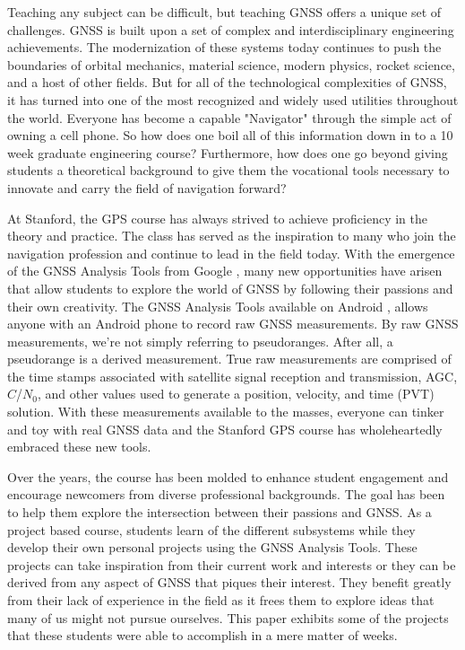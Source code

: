 \documentclass[12pt, conference, onecolumn, draftclsnofoot]{IEEEtran}
\begin{document}
Teaching any subject can be difficult, but teaching GNSS offers a unique set of challenges.
GNSS is built upon a set of complex and interdisciplinary engineering achievements. 
The modernization of these systems today continues to push the boundaries of orbital mechanics, material science, modern physics, rocket science, and a host of other fields.
But for all of the technological complexities of GNSS, it has turned into one of the most recognized and widely used utilities throughout the world.
Everyone has become a capable "Navigator" through the simple act of owning a cell phone.
So how does one boil all of this information down in to a 10 week graduate engineering course?
Furthermore, how does one go beyond giving students a theoretical background to give them the vocational tools necessary to innovate and carry the field of navigation forward?

At Stanford, the GPS course has always strived to achieve proficiency in the theory and practice.
The class has served as the inspiration to many who join the navigation profession and continue to lead in the field today.
With the emergence of the GNSS Analysis Tools from Google \cite{vanDiggelen2018}, many new opportunities have arisen that allow students to explore the world of GNSS by following their passions and their own creativity.
The GNSS Analysis Tools available on Android \cite{GNSSAnalysisTools}, allows anyone with an Android phone to record raw GNSS measurements.
By raw GNSS measurements, we're not simply referring to pseudoranges.
After all, a pseudorange is a derived measurement.
True raw measurements are comprised of the time stamps associated with satellite signal reception and transmission, AGC, $C$/$N_0$, and other values used to generate a position, velocity, and time (PVT) solution.
With these measurements available to the masses, everyone can tinker and toy with real GNSS data and the Stanford GPS course has wholeheartedly embraced these new tools.

Over the years, the course has been molded to enhance student engagement and encourage newcomers from diverse professional backgrounds. 
The goal has been to help them explore the intersection between their passions and GNSS.
As a project based course, students learn of the different subsystems while they develop their own personal projects using the GNSS Analysis Tools.
These projects can take inspiration from their current work and interests or they can be derived from any aspect of GNSS that piques their interest.
They benefit greatly from their lack of experience in the field as it frees them to explore ideas that many of us might not pursue ourselves.
This paper exhibits some of the projects that these students were able to accomplish in a mere matter of weeks.
\end{document}
